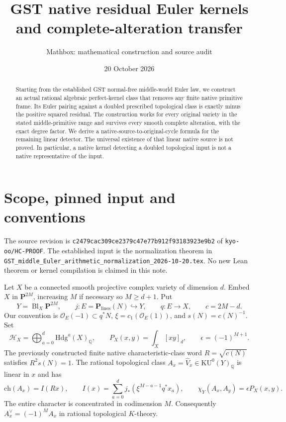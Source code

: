 \documentclass[11pt]{article}
\title{GST native residual Euler kernels and complete-alteration transfer}
\author{Mathbox: mathematical construction and source audit}
\date{20 October 2026}
\newcommand{\Q}{\mathbb Q}
\newcommand{\Hdg}{\mathrm{Hdg}}
\newcommand{\KU}{\mathrm{KU}}
\newcommand{\ch}{\mathrm{ch}}
\begin{document}
\maketitle
\begin{abstract}
Starting from the established GST normal-free middle-world Euler law,
we construct an actual rational algebraic perfect-kernel class that
removes any finite native primitive frame. Its Euler pairing against
a doubled prescribed topological class is exactly minus the positive
squared residual. The construction works for every original variety
in the stated middle-primitive range and survives every smooth
complete alteration, with the exact degree factor. We derive a
native-source-to-original-cycle formula for the remaining linear
detector. The universal existence of that linear native source is
not proved. In particular, a native kernel detecting a doubled
topological input is not a native representative of the input.
\end{abstract}

\section{Scope, pinned input and conventions}
The source revision is
\texttt{c2479cac309ce2379c47e77b912f93183923e9b2}
of \texttt{kyo-oo/HC-PROOF}. The established input is the
normalization theorem in
\texttt{GST\_middle\_Euler\_arithmetic\_normalization\_2026-10-20.tex}.
No new Lean theorem or kernel compilation is claimed in this note.

Let $X$ be a connected smooth projective complex variety of dimension
$d$. Embed $X$ in $\mathbf P^{2M}$, increasing $M$ if necessary so
$M\ge d+1$. Put
\[
 Y=\operatorname{Bl}_X\mathbf P^{2M},\qquad
 j:E=\mathbf P_{\mathrm{lines}}(N)\hookrightarrow Y,\qquad
 q:E\longrightarrow X,\qquad c=2M-d .
\]
Our convention is $\mathcal O_E(-1)\subset q^*N$,
$\xi=c_1(\mathcal O_E(1))$, and $s(N)=c(N)^{-1}$.
Set
\[
 \mathcal H_X=\bigoplus_{a=0}^d\Hdg^a(X)_\Q,\qquad
 P_X(x,y)=\int_X[xy]_d,\qquad \epsilon=(-1)^{M+1}.
\]
The previously constructed finite native characteristic-class word
$R=\sqrt{c(N)}$ satisfies $R^2s(N)=1$.
The rational topological class $A_x=\widehat V_x\in\KU^0(Y)_\Q$
is linear in $x$ and has
\[
 \ch(A_x)=I(Rx),\qquad
 I(x)=\sum_{a=0}^d
 j_*(\xi^{M-a-1}q^*x_a),\qquad
 \chi_Y(A_x,A_y)=\epsilon P_X(x,y).                 \tag{1}
\]
The entire character is concentrated in codimension $M$.
Consequently $A_x^\vee=(-1)^M A_x$ in rational topological $K$-theory.
\end{document}
